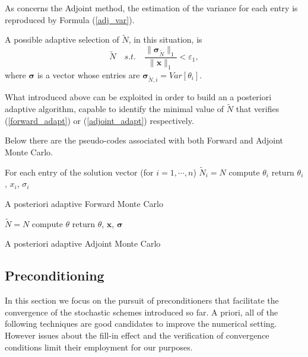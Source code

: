\documentclass[a4paper,10pt]{article}
\begin{document}
As concerns the Adjoint method, the estimation of the variance for each entry
is reproduced by Formula (\ref{adj_var}).

A possible adaptive selection of $\tilde{N}$, in this situation, is
\begin{equation}
\tilde{N} \quad s.t. \quad \frac{\lVert
\boldsymbol{\sigma}_{\tilde{N}}\rVert_1}{\lVert
\mathbf{x}\rVert_1}<\varepsilon_1,
\label{adjoint_adapt}
\end{equation}
where $\boldsymbol{\sigma}$ is a vector whose entries are
$\boldsymbol{\sigma}_{\tilde{N},i}=Var[\theta_i]$.

What introduced above can be exploited in order to build
an a posteriori adaptive algorithm, capable to identify the minimal value of
$\tilde{N}$ that verifies (\ref{forward_adapt}) or (\ref{adjoint_adapt})
respectively.

Below there are the pseudo-codes associated with both Forward and Adjoint Monte
Carlo.

\begin{algorithm}[H]
 For each entry of the solution vector (for $i=1,\cdots,n$) \;
 $\tilde{N}_i=N$\;
 compute $\theta_i$\;
 return $\theta_i$, $x_i$, $\sigma_i$\;
 \caption{A posteriori adaptive Forward Monte Carlo}
\end{algorithm}

\begin{algorithm}[H]
 $\tilde{N}=N$\;
 compute $\theta$\;
 return $\theta$, $\mathbf{x}$, $\boldsymbol{\sigma}$\;
 \caption{A posteriori adaptive Adjoint Monte Carlo}
\end{algorithm}

\subsection{Preconditioning}

In this section we focus on the pursuit of preconditioners that facilitate the
convergence of the stochastic schemes introduced so far. A priori, all of the
following techniques are good candidates to improve the numerical setting.
However issues about the fill-in effect and the verification of convergence
conditions limit their employment for our purposes.
\end{document}
